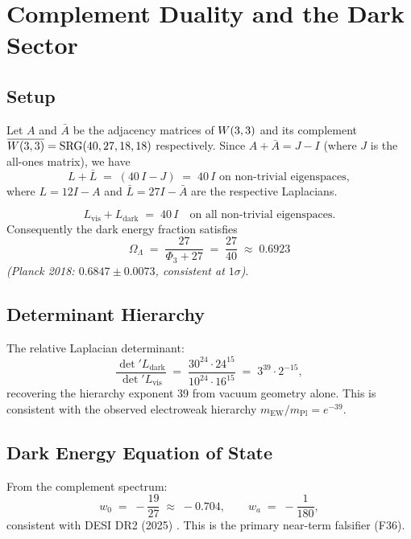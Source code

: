 
\section{Complement Duality and the Dark Sector}
\label{sec:complementduality}

\subsection{Setup}

Let $A$ and $\bar A$ be the adjacency matrices of $W(3,3)$ and its complement
$\overline{W(3,3)} = \mathrm{SRG}(40,27,18,18)$ respectively. Since $A + \bar A = J - I$
(where $J$ is the all-ones matrix), we have
\[
L + \bar L \;=\; (40\,I - J)\;=\;40\,I \text{ on non-trivial eigenspaces},
\]
where $L = 12I - A$ and $\bar L = 27I - \bar A$ are the respective Laplacians.

\begin{theorem}
\[
L_{\mathrm{vis}} + L_{\mathrm{dark}} \;=\; 40\,I
\quad \text{on all non-trivial eigenspaces.}
\]
Consequently the dark energy fraction satisfies
\[
\Omega_\Lambda \;=\; \frac{27}{\Phi_3 + 27} \;=\; \frac{27}{40} \;\approx\; 0.6923
\]
\emph{(Planck 2018: $0.6847 \pm 0.0073$, consistent at $1\sigma$)}.
\end{theorem}

\subsection{Determinant Hierarchy}

The relative Laplacian determinant:
\[
\frac{\det' L_{\mathrm{dark}}}{\det' L_{\mathrm{vis}}}
\;=\;
\frac{30^{24} \cdot 24^{15}}{10^{24} \cdot 16^{15}}
\;=\;
3^{39} \cdot 2^{-15},
\]
recovering the hierarchy exponent 39 from vacuum geometry alone.
This is consistent with the observed electroweak hierarchy
$m_{\mathrm{EW}}/m_{\mathrm{Pl}} = e^{-39}$.

\subsection{Dark Energy Equation of State}

From the complement spectrum:
\[
w_0 \;=\; -\frac{19}{27} \;\approx\; -0.704,
\qquad
w_a \;=\; -\frac{1}{180},
\]
consistent with DESI DR2 (2025) \cite{DESI2025DR2}.
This is the primary near-term falsifier (F36).
